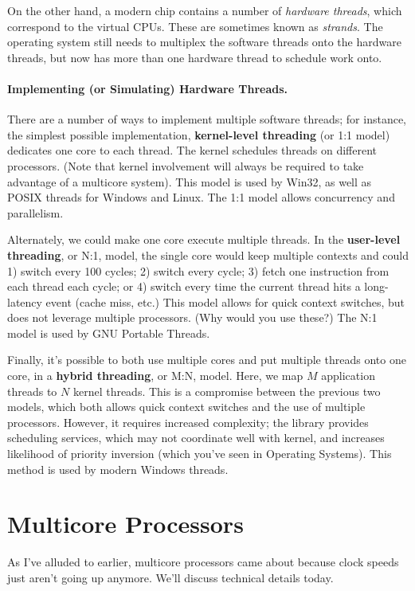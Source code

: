 On the other hand, a modern chip contains a number of \emph{hardware
threads}, which correspond to the virtual CPUs. These are sometimes
known as \emph{strands}. The operating system still needs to 
multiplex the software threads onto the hardware threads, but now has
more than one hardware thread to schedule work onto.



\paragraph{Implementing (or Simulating) Hardware Threads.} 
There are a number of ways to implement multiple software threads; for
instance, the simplest possible implementation, {\bf kernel-level
threading} (or 1:1 model) dedicates one core to each thread. The kernel schedules threads
on different processors. (Note that kernel involvement will always be required to
take advantage of a multicore system). This model is used by Win32, as well as
POSIX threads for Windows and Linux. The 1:1 model allows concurrency and parallelism.

Alternately, we could make one core execute multiple threads. In the
{\bf user-level threading}, or N:1, model, the single core would keep
multiple contexts and could 1) switch every 100 cycles; 2) switch
every cycle; 3) fetch one instruction from each thread each cycle; or
4) switch every time the current thread hits a long-latency event
(cache miss, etc.) This model allows for quick context switches, but
does not leverage multiple processors. (Why would you use these?) The N:1 model is used by
GNU Portable Threads.

Finally, it's possible to both use multiple cores and put multiple
threads onto one core, in a {\bf hybrid threading}, or M:N, model. Here, we map $M$ application threads to $N$ kernel threads. This
is a compromise between the previous two models, which both allows
quick context switches and the use of multiple processors. However, it
requires increased complexity; the library provides scheduling
services, which may not coordinate well with kernel, and increases
likelihood of priority inversion (which you've seen in Operating
Systems).  This method is used by modern Windows threads.


\section*{Multicore Processors}
As I've alluded to earlier, multicore processors came about because
clock speeds just aren't going up anymore. We'll discuss technical
details today.

